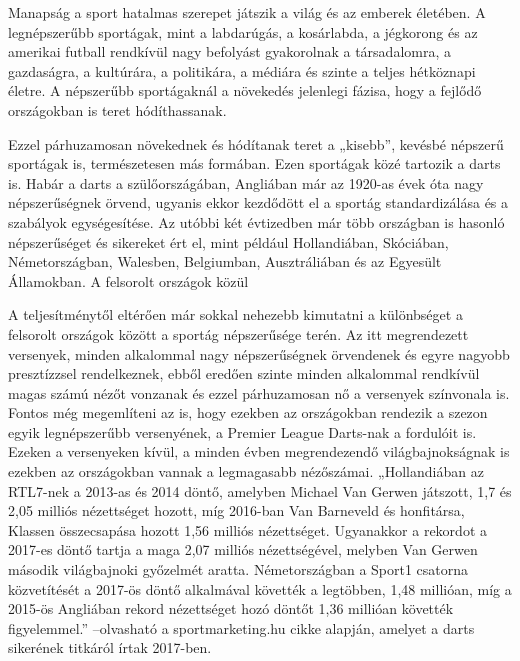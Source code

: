 
Manapság a sport hatalmas szerepet játszik a világ és az emberek életében. A legnépszerűbb 
sportágak, mint a labdarúgás, a kosárlabda, a jégkorong és az amerikai futball rendkívül 
nagy befolyást gyakorolnak a társadalomra, a gazdaságra, a kultúrára, a politikára, a médiára és 
szinte a teljes hétköznapi életre. A népszerűbb sportágaknál a növekedés jelenlegi fázisa, hogy a fejlődő országokban is teret hódíthassanak.

Ezzel párhuzamosan növekednek és hódítanak teret a „kisebb”, kevésbé népszerű sportágak is, természetesen más formában. Ezen sportágak közé tartozik a darts is. Habár a darts a szülőországában, Angliában már az 1920-as évek óta nagy népszerűségnek örvend, ugyanis ekkor 
kezdődött el a sportág standardizálása és a szabályok egységesítése. Az utóbbi két évtizedben már több országban is hasonló népszerűséget és sikereket ért el, mint például Hollandiában, Skóciában, Németországban, Walesben, Belgiumban, 
Ausztráliában és az Egyesült Államokban. A felsorolt országok közül 

A teljesítménytől eltérően már sokkal nehezebb kimutatni a különbséget a felsorolt országok között a sportág népszerűsége terén. Az itt megrendezett versenyek, minden alkalommal nagy népszerűségnek örvendenek és egyre nagyobb presztízzsel rendelkeznek, ebből eredően szinte minden alkalommal rendkívül magas számú nézőt vonzanak és ezzel párhuzamosan nő a versenyek színvonala is. Fontos még megemlíteni az is, hogy ezekben az országokban rendezik a szezon egyik legnépszerűbb versenyének, a Premier League Darts-nak a fordulóit is. Ezeken a versenyeken kívül, a minden évben megrendezendő világbajnokságnak is ezekben az országokban vannak a legmagasabb nézőszámai. „Hollandiában az RTL7-nek a 2013-as és 2014 döntő, amelyben Michael Van Gerwen játszott, 1,7 és 2,05 milliós nézettséget hozott, míg 2016-ban Van Barneveld és honfitársa, Klassen összecsapása hozott 1,56 milliós nézettséget. Ugyanakkor a rekordot a 2017-es döntő tartja a maga 2,07 milliós nézettségével, melyben Van Gerwen második világbajnoki 
győzelmét aratta. Németországban a Sport1 csatorna közvetítését a 2017-ös döntő alkalmával követték a legtöbben, 1,48 millióan, míg a 2015-ös Angliában rekord nézettséget hozó döntőt 1,36 millióan követték figyelemmel.” –olvasható a sportmarketing.hu cikke alapján, amelyet a darts sikerének titkáról írtak 2017-ben.
\cite{Darts}


